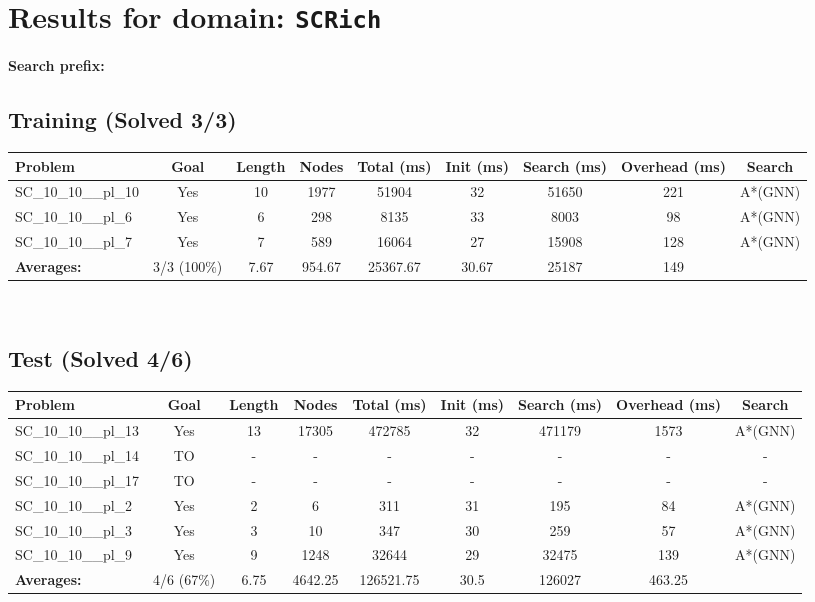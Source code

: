 \documentclass{article}
\begin{document}
\section*{Results for domain: \texttt{SCRich}}
\textbf{Search prefix:} 
\\[0.5cm]
\subsection*{Training (Solved 3/3)}
\begin{tabular}{lcccccccc}
\toprule
Problem & Goal & Length & Nodes & Total (ms) & Init (ms) & Search (ms) & Overhead (ms) & Search \\
\midrule
SC\_10\_10\_\_pl\_10 & Yes & 10 & 1977 & 51904 & 32 & 51650 & 221 & A*(GNN) \\
SC\_10\_10\_\_pl\_6 & Yes & 6 & 298 & 8135 & 33 & 8003 & 98 & A*(GNN) \\
SC\_10\_10\_\_pl\_7 & Yes & 7 & 589 & 16064 & 27 & 15908 & 128 & A*(GNN) \\
\textbf{Averages:} & 3/3 (100\%) & 7.67 & 954.67 & 25367.67 & 30.67 & 25187 & 149 & \\
\bottomrule
\end{tabular}
\\[0.7cm]
\subsection*{Test (Solved 4/6)}
\begin{tabular}{lcccccccc}
\toprule
Problem & Goal & Length & Nodes & Total (ms) & Init (ms) & Search (ms) & Overhead (ms) & Search \\
\midrule
SC\_10\_10\_\_pl\_13 & Yes & 13 & 17305 & 472785 & 32 & 471179 & 1573 & A*(GNN) \\
SC\_10\_10\_\_pl\_14 & TO & - & - & - & - & - & - & - \\
SC\_10\_10\_\_pl\_17 & TO & - & - & - & - & - & - & - \\
SC\_10\_10\_\_pl\_2 & Yes & 2 & 6 & 311 & 31 & 195 & 84 & A*(GNN) \\
SC\_10\_10\_\_pl\_3 & Yes & 3 & 10 & 347 & 30 & 259 & 57 & A*(GNN) \\
SC\_10\_10\_\_pl\_9 & Yes & 9 & 1248 & 32644 & 29 & 32475 & 139 & A*(GNN) \\
\textbf{Averages:} & 4/6 (67\%) & 6.75 & 4642.25 & 126521.75 & 30.5 & 126027 & 463.25 & \\
\bottomrule
\end{tabular}
\\[0.7cm]
\end{document}
